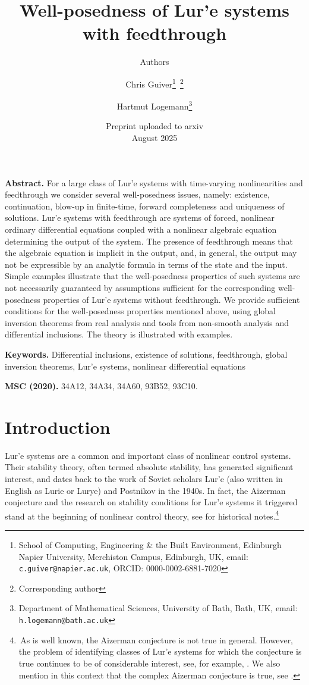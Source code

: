 \documentclass[a4paper,11pt]{article}
\title{Well-posedness of Lur'e systems with feedthrough}
\author{Authors}
\author{Chris Guiver\thanks{School of Computing, Engineering \& the Built Environment, Edinburgh Napier University, Merchiston Campus, Edinburgh, UK, email: {\tt c.guiver@napier.ac.uk}, ORCID: 0000-0002-6881-7020}\,
\thanks{Corresponding author}
\and Hartmut Logemann\thanks{Department of Mathematical Sciences,
University of Bath, Bath, UK, email: {\tt h.logemann@bath.ac.uk}}
}
\date{Preprint uploaded to arxiv \\ August 2025}
\numberwithin{equation}{section}
\numberwithin{figure}{section}
\numberwithin{table}{section}
\begin{document}
\maketitle

%
%
%
%
\textbf{Abstract.} For a large class of Lur'e systems with time-varying nonlinearities and feedthrough we consider several well-posedness issues, namely:
existence, continuation, blow-up in finite-time, forward completeness and uniqueness of solutions. Lur'e systems with feedthrough are systems of forced, nonlinear ordinary differential equations coupled with a nonlinear algebraic equation determining the output
of the system. The presence of feedthrough means that the algebraic equation is implicit in the output, and, in general, the output may not be expressible by an analytic formula in terms of the state and the input. Simple examples illustrate that the well-posedness properties of such systems are not necessarily guaranteed by assumptions sufficient for the corresponding well-posedness properties of Lur'e systems without feedthrough. We provide
sufficient conditions for the well-posedness properties mentioned above, using global inversion
theorems from real analysis and tools from non-smooth analysis and differential inclusions. The theory is illustrated with examples.

%
%
\textbf{Keywords.} %
Differential inclusions, 
existence of solutions, 
feedthrough, %
global inversion theorems, 
Lur'e systems, 
nonlinear differential equations%


%
%
{\bfseries MSC (2020).} 34A12, 34A34, 34A60, 93B52, 93C10.


%
%
\section{Introduction}
%
Lur'e systems are a common and important class of nonlinear control systems. Their stability theory, often termed absolute stability, has generated significant interest, and dates
back to the work of Soviet scholars Lur'e (also written in English as Lurie or Lurye) and Postnikov in the 1940s. In fact, the Aizerman conjecture and the research on stability
conditions for Lur'e systems it triggered stand at the beginning of
nonlinear control theory, see \cite{l06} for historical notes.\footnote[4]{\,As is well known,  the Aizerman conjecture is not true in general. However, the problem of identifying classes of
Lur'e systems for which the conjecture is true continues to be of considerable interest,
see, for example, \cite{dgt23,nmig19}. We also mention in this context that the complex Aizerman conjecture is true, see \cite[Section 5.6.3]{hp05}.}
\end{document}
